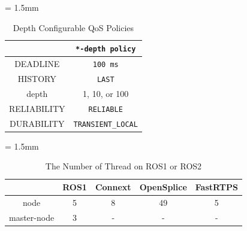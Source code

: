\documentclass{sig-alternate-05-2015}
\begin{document}
\renewcommand{\arraystretch}{1.0}
\begin{table}[t]
\caption{\label{tb:depth_qos}Depth Configurable QoS Policies}
\centering
\tabcolsep = 1.5mm              %
\begin{tabular}{c|c}
\hline
 & \textbf{\texttt{*-depth policy} }\\
\hline
\hline
DEADLINE & \texttt{100 ms}\\
HISTORY & \texttt{LAST}\\
depth & 1, 10, or 100\\
RELIABILITY & \texttt{RELIABLE}\\
DURABILITY & \texttt{TRANSIENT\_LOCAL}\\
\hline
\end{tabular}
\end{table}

\renewcommand{\arraystretch}{1.1}
\begin{table}[t]
\caption{\label{tb:thread}The Number of Thread on ROS1 or ROS2}
\centering
\tabcolsep = 1.5mm              %
\begin{tabular}{c|cccc}
\hline
 & ROS1 & Connext & OpenSplice & FastRTPS \\
\hline
\hline
node & 5 & 8 & 49 & 5 \\
master-node & 3 & - & - & - \\
\hline
\end{tabular}
\end{table}
\end{document}
